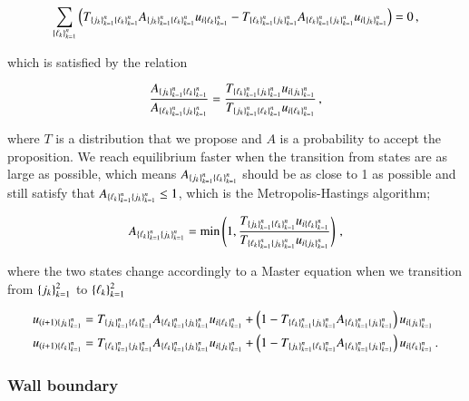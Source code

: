 \documentclass[11pt,english,a4paper]{article}
\begin{document}
\begin{flushleft}
\begin{align*}
\sum_{\left\lbrace{\ell_k}\right\rbrace_{k=1}^n}\left({T_{\left\lbrace{j_k}\right\rbrace_{k=1}^n \left\lbrace{\ell_k}\right\rbrace_{k=1}^n}A_{\left\lbrace{j_k}\right\rbrace_{k=1}^n \left\lbrace{\ell_k}\right\rbrace_{k=1}^n} u_{i\left\lbrace{\ell_k}\right\rbrace_{k=1}^n} - T_{\left\lbrace{\ell_k}\right\rbrace_{k=1}^n \left\lbrace{j_k}\right\rbrace_{k=1}^n}A_{\left\lbrace{\ell_k}\right\rbrace_{k=1}^n \left\lbrace{j_k}\right\rbrace_{k=1}^n} u_{i\left\lbrace{j_k}\right\rbrace_{k=1}^n}}\right) = 0 \,,
\end{align*}


which is satisfied by the relation

\begin{align*}
\frac{A_{\left\lbrace{j_k}\right\rbrace_{k=1}^n \left\lbrace{\ell_k}\right\rbrace_{k=1}^n}}{A_{\left\lbrace{\ell_k}\right\rbrace_{k=1}^n \left\lbrace{j_k}\right\rbrace_{k=1}^n}} = \frac{T_{\left\lbrace{\ell_k}\right\rbrace_{k=1}^n \left\lbrace{j_k}\right\rbrace_{k=1}^n}u_{i\left\lbrace{j_k}\right\rbrace_{k=1}^n}}{T_{\left\lbrace{j_k}\right\rbrace_{k=1}^n \left\lbrace{\ell_k}\right\rbrace_{k=1}^n}u_{i\left\lbrace{\ell_k}\right\rbrace_{k=1}^n}} \,,
\end{align*}

where $T$ is a distribution that we propose and $A$ is a probability to accept the proposition. We reach equilibrium faster when the transition from states are as large as possible, which means $A_{\left\lbrace{j_k}\right\rbrace_{k=1}^n \left\lbrace{\ell_k}\right\rbrace_{k=1}^n}$ should be as close to 1 as possible and still satisfy that $A_{\left\lbrace{\ell_k}\right\rbrace_{k=1}^n \left\lbrace{j_k}\right\rbrace_{k=1}^n} \leq 1$, which is the Metropolis-Hastings algorithm;

\begin{align}
A_{\kr{\ell_k}_{k=1}^n\kr{j_k}_{k=1}^n} = \min\p{1,\frac{T_{\kr{j_k}_{k=1}^n\kr{\ell_k}_{k=1}^n}u_{i\kr{\ell_k}_{k=1}^n}}{T_{\kr{\ell_k}_{k=1}^n\kr{j_k}_{k=1}^n}u_{i\kr{j_k}_{k=1}^n}}}\,,
\label{eq_48}
\end{align}

where the two states change accordingly to a Master equation when we transition from $\left\lbrace{j_k}\right\rbrace_{k=1}^2$ to $\left\lbrace{\ell_k}\right\rbrace_{k=1}^2$ 

\begin{align}
u_{(i+1)\kr{j_k}_{k=1}^n} &=  T_{\kr{j_k}_{k=1}^n\kr{\ell_k}_{k=1}^n} A_{\kr{\ell_k}_{k=1}^n\kr{j_k}_{k=1}^n} u_{i\kr{\ell_k}_{k=1}^n} + \p{1-T_{\kr{\ell_k}_{k=1}^n\kr{j_k}_{k=1}^n} A_{\kr{\ell_k}_{k=1}^n\kr{j_k}_{k=1}^n}} u_{i\kr{j_k}_{k=1}^n}
\label{eq_49}\\
u_{(i+1)\kr{\ell_k}_{k=1}^n} &= T_{\kr{\ell_k}_{k=1}^n\kr{j_k}_{k=1}^n} A_{\kr{\ell_k}_{k=1}^n\kr{j_k}_{k=1}^n} u_{i\kr{j_k}_{k=1}^n} + \p{1-T_{\kr{j_k}_{k=1}^n\kr{\ell_k}_{k=1}^n} A_{\kr{\ell_k}_{k=1}^n\kr{j_k}_{k=1}^n}} u_{i\kr{\ell_k}_{k=1}^n} \,.
\label{eq_50}
\end{align} 

\subsubsection{Wall boundary}


\end{flushleft}
\end{document}

